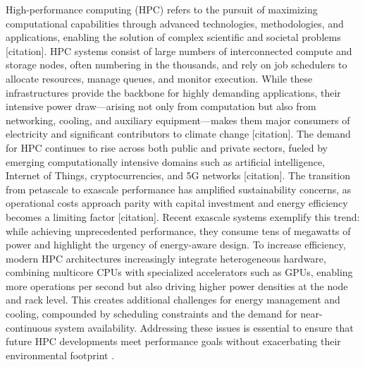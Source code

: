 High-performance computing (HPC) refers to the pursuit of maximizing computational capabilities through advanced technologies, methodologies, and applications, enabling the solution of complex scientific and societal problems [citation]. HPC systems consist of large numbers of interconnected compute and storage nodes, often numbering in the thousands, and rely on job schedulers to allocate resources, manage queues, and monitor execution. While these infrastructures provide the backbone for highly demanding applications, their intensive power draw—arising not only from computation but also from networking, cooling, and auxiliary equipment—makes them major consumers of electricity and significant contributors to climate change [citation]. The demand for HPC continues to rise across both public and private sectors, fueled by emerging computationally intensive domains such as artificial intelligence, Internet of Things, cryptocurrencies, and 5G networks [citation]. The transition from petascale to exascale performance has amplified sustainability concerns, as operational costs approach parity with capital investment and energy efficiency becomes a limiting factor [citation]. Recent exascale systems exemplify this trend: while achieving unprecedented performance, they consume tens of megawatts of power and highlight the urgency of energy-aware design. To increase efficiency, modern HPC architectures increasingly integrate heterogeneous hardware, combining multicore CPUs with specialized accelerators such as GPUs, enabling more operations per second but also driving higher power densities at the node and rack level. This creates additional challenges for energy management and cooling, compounded by scheduling constraints and the demand for near-continuous system availability. Addressing these issues is essential to ensure that future HPC developments meet performance goals without exacerbating their environmental footprint \cite{Silva_2024}.


